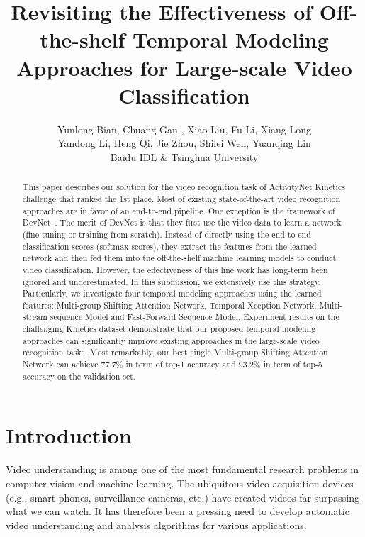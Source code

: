 \documentclass[10pt,twocolumn,letterpaper]{article}
\begin{document}
\title{ Revisiting the Effectiveness of Off-the-shelf Temporal Modeling \\ Approaches for Large-scale Video Classification}

\author{ Yunlong Bian, Chuang Gan , Xiao Liu, Fu Li, Xiang Long \\
Yandong Li, Heng Qi, Jie Zhou, Shilei Wen, Yuanqing Lin\\
Baidu IDL \& Tsinghua University\\
}


\maketitle



\renewcommand{\thefootnote}{\fnsymbol{footnote}}
\begin{abstract}
  This paper describes our solution for the video recognition task of ActivityNet Kinetics challenge that ranked the 1st place. Most of existing state-of-the-art video recognition approaches are in favor of an end-to-end pipeline. One exception is the framework of DevNet~\cite{devnet}. The merit of DevNet is that they first use the video data to learn a network (\ie fine-tuning or training from scratch). Instead of directly using the end-to-end classification scores (\eg softmax scores), they extract the features from the learned network and then fed them into the off-the-shelf machine learning models to conduct video classification. However, the effectiveness of this line work has long-term been ignored and underestimated. In this submission, we extensively use this strategy. Particularly, we investigate four temporal modeling approaches using the learned features: Multi-group Shifting Attention Network, Temporal Xception Network, Multi-stream sequence Model and Fast-Forward Sequence Model. Experiment results on the challenging Kinetics dataset demonstrate that our proposed temporal modeling approaches can significantly improve existing approaches in the large-scale video recognition tasks.  Most remarkably, our best single Multi-group Shifting Attention Network can achieve 77.7\% in term of top-1 accuracy and 93.2\% in term of top-5 accuracy on the validation set.
\end{abstract}

\section{Introduction}
Video understanding is among one of the most fundamental research problems in computer vision and machine learning. The ubiquitous video acquisition devices (e.g., smart phones, surveillance cameras, etc.) have created videos far surpassing what we can watch. It has therefore been a pressing need to develop automatic video understanding and analysis algorithms for various applications.
\end{document}
